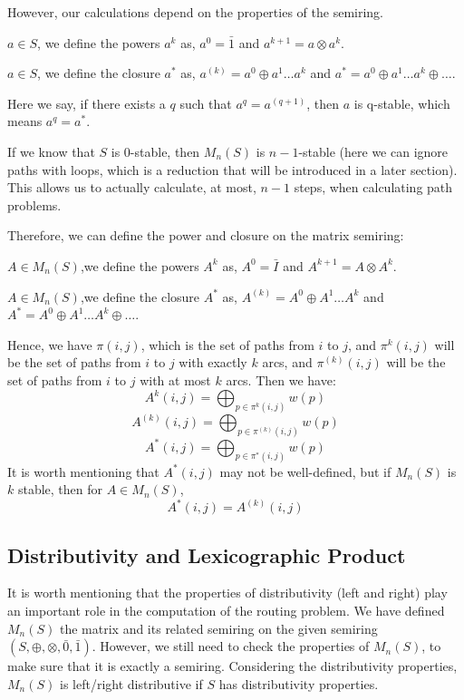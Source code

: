 \documentclass[a4paper,12pt,twoside,openright]{report}
\begin{document}
However, our calculations depend on the properties of the semiring.

$a\in S$, we define the powers $a^k$ as, $a^0 = \bar{1}$ and $a^{k+1} = a \otimes a^k$.

$a\in S$, we define the closure $a^*$ as, $a^{(k)} = a^0 \oplus a^1 \dots  a^k$ and $a^* = a^0 \oplus a^1 \dots  a^k \oplus \dots$.

Here we say, if there exists a $q$ such that $a^{q} = a^{(q+1)}$, then $a$ is q-stable, which means $a^{q} = a^*$.

If we know that $S$ is 0-stable, then $M_n(S)$ is $n-1$-stable \cite{griffin_2017} (here we can ignore paths with loops, which is a reduction that will be introduced in a later section). 
This allows us to actually calculate, at most, $n-1$ steps, when calculating path problems.

Therefore, we can define the power and closure on the matrix semiring:

$A\in M_n(S)$,we define the powers $A^k$ as, $A^0 = \bar{I}$ and $A^{k+1} = A \otimes A^k$.

$A\in M_n(S)$,we define the closure $A^*$ as, $A^{(k)} = A^0 \oplus A^1 \dots  A^k$ and $A^* = A^0 \oplus A^1 \dots  A^k \oplus \dots$.


Hence, we have $\pi(i,j)$, which is the set of paths from $i$ to $j$, and $\pi^k(i,j)$ will be the set of paths from $i$ to $j$ with exactly $k$ arcs, and $\pi^{(k)}(i,j)$ will be the set of paths from $i$ to $j$ with at most $k$ arcs. Then we have:
\[A^k(i,j) = \bigoplus_{p \in \pi^k (i,j)}w(p)\]
\[A^{(k)}(i,j) = \bigoplus_{p \in \pi^{(k)} (i,j)}w(p)\]
\[A^*(i,j) = \bigoplus_{p \in \pi^* (i,j)}w(p)\]
It is worth mentioning that $A^*(i,j)$ may not be well-defined, but if $M_n(S)$ is $k$ stable, then for $A\in M_n(S)$, \[A^*(i,j) = A^{(k)}(i,j)\]

\subsection{Distributivity and Lexicographic Product}
It is worth mentioning that the properties of distributivity (left and right) play an important role in the computation of the routing problem.
We have defined $M_n(S)$ the matrix and its related semiring on the given semiring $(S,\oplus,\otimes,\bar0,\bar1)$.
However, we still need to check the properties of $M_n(S)$, to make sure that it is exactly a semiring.
Considering the distributivity properties, $M_n(S)$ is left/right distributive if $S$ has distributivity properties.
\end{document}
